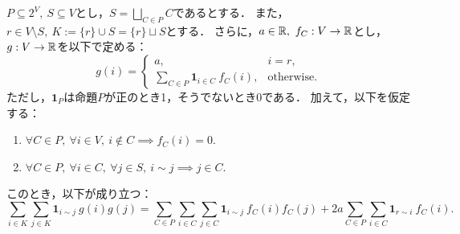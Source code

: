 \begin{lemma}
  \label{lem:combined_cross_sum}
  \leanok
  \uses{}
  $P \subseteq 2 ^ V,\ S \subseteq V$とし，$S = \displaystyle \bigsqcup_{C \in P} C$であるとする．
  また，$r \in V \setminus S,\ K := \{r\} \cup S = \{r\} \sqcup S$とする．
  さらに，$a \in \mathbb{R},\ f_C : V \rightarrow \mathbb{R}$とし，$g : V \rightarrow \mathbb{R}$を以下で定める：
  \begin{equation}
    g(i) = \begin{cases}
      a, & i = r,\\
      \displaystyle \sum_{C \in P} \bm{1}_{i \in C}\ f_C(i), & \text{otherwise}.
    \end{cases}
  \end{equation}
  ただし，$\bm{1}_{P}$は命題$P$が正のとき1，そうでないとき0である．
  加えて，以下を仮定する：
  \begin{enumerate}[label = (\roman*)]
    \item $\forall C \in P,\ \forall i \in V,\ i \notin C \implies f_C(i) = 0$.
    \item $\forall C \in P,\ \forall i \in C,\ \forall j \in S,\ i \sim j \implies j \in C$.
  \end{enumerate}
  このとき，以下が成り立つ：
  \begin{equation} \label{eq:combined_cross_sum_statement}
    \sum_{i \in K} \sum_{j \in K} \bm{1}_{i \sim j}\ g(i) g(j)
    = \sum_{C \in P} \sum_{i \in C} \sum_{j \in C} \bm{1}_{i \sim j}\ f_C(i) f_C(j)
      + 2 a \sum_{C \in P} \sum_{i \in C} \bm{1}_{r \sim i}\ f_C(i).
  \end{equation}
\end{lemma}


